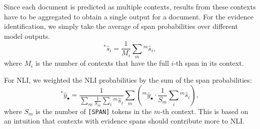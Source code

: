 Since each document is predicted as multiple contexts, results from these contexts have to be aggregated to obtain a single output for a document.
For the evidence identification, we simply take the average of span probabilities over different model outputs.
\begin{equation}
    {}^\ast\hat{s}_i = \frac{1}{M_i} \sum_m {}^m\hat{s}_i,
\end{equation}
where $M_i$ is the number of contexts that have the full $i$-th span in its context.

For NLI, we weighted the NLI probabilities by the sum of the span probabilities:
\begin{equation}
    {}^\ast\hat{y}_\bullet =  \frac{1}{\sum_m \frac{1}{S_m} \sum_i {}^m\hat{s}_i}\sum_m \left({}^m\hat{y}_\bullet \cdot \frac{1}{S_m} \sum_i {}^m\hat{s}_i\right),
\end{equation}
where $S_m$ is the number of \texttt{[SPAN]} tokens in the $m$-th context.
This is based on an intuition that contexts with evidence spans should contribute more to NLI.
